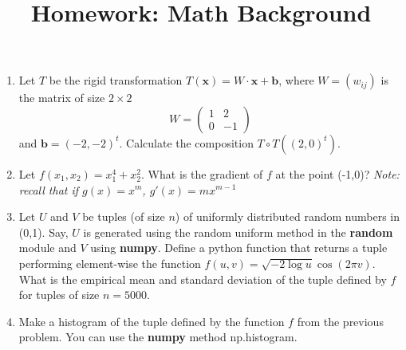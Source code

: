 \documentclass[]{article}
\title{Homework: Math Background}
\begin{document}
\maketitle

\begin{enumerate}
	\item Let $T$ be the rigid transformation $T(\mathbf{x})=W \cdot \mathbf{x}+ \mathbf{b}$, where $W=(w_{ij})$ is the matrix of size $2 \times 2$ 
	\begin{equation}
		W=
		\begin{pmatrix}
			1& 2 \\ 
			0 & -1 
		\end{pmatrix}
	\end{equation}
	and $\mathbf{b}=(-2,-2)^t$. 
	Calculate the composition $T\circ T((2,0)^t)$.
	\item 
	Let $f(x_1,x_2)=x_1^4+x_2^2$. What is the gradient of $f$ at the point (-1,0)? {\sl Note: recall that if $g(x)=x^m$, $g'(x)=mx^{m-1}$}
	\item 
	Let $U$ and $V$ be tuples (of size $n$) of uniformly distributed random numbers in (0,1). Say, $U$ is generated using the random uniform method in the {\bf random}  module and $V$ using {\bf numpy}. Define a python function that returns a tuple performing element-wise the function $f(u,v)=\sqrt{-2 \log u} \cos (2 \pi v)$. What is the empirical mean and standard deviation of the tuple defined by $f$ for tuples of size $n=5000$.
	\item Make a histogram of the tuple defined by the function $f$ from the previous problem. You can use the {\bf numpy} method np.histogram.
	
	
\end{enumerate}
\end{document}
